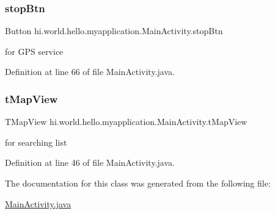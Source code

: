\subsubsection{\texorpdfstring{stopBtn}{stopBtn}}
{\footnotesize\ttfamily Button hi.\+world.\+hello.\+myapplication.\+Main\+Activity.\+stop\+Btn\hspace{0.3cm}{\ttfamily [private]}}



for G\+PS service 



Definition at line 66 of file Main\+Activity.\+java.

\mbox{\label{classhi_1_1world_1_1hello_1_1myapplication_1_1_main_activity_a99006b1a0a4da0f230364e38d46f1741}} 
\subsubsection{\texorpdfstring{tMapView}{tMapView}}
{\footnotesize\ttfamily T\+Map\+View hi.\+world.\+hello.\+myapplication.\+Main\+Activity.\+t\+Map\+View\hspace{0.3cm}{\ttfamily [private]}}



for searching list 



Definition at line 46 of file Main\+Activity.\+java.



The documentation for this class was generated from the following file\+:\begin{DoxyCompactItemize}
\item 
\mbox{\hyperlink{_main_activity_8java}{Main\+Activity.\+java}}\end{DoxyCompactItemize}
